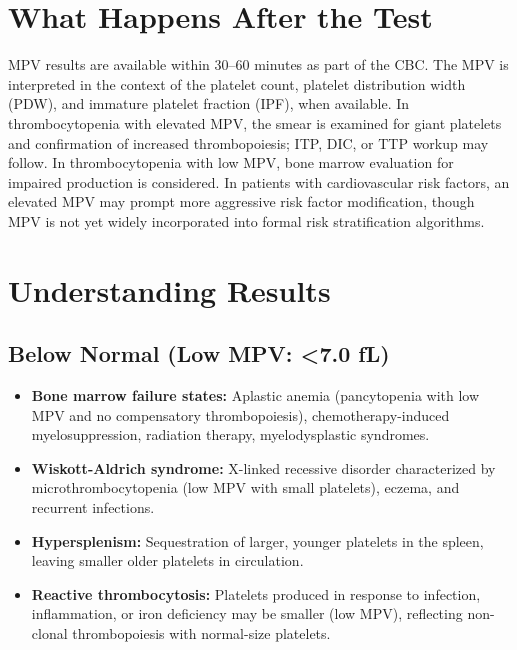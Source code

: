 \section*{What Happens After the Test}
MPV results are available within 30--60 minutes as part of the CBC. The MPV is interpreted in the context of the platelet count, platelet distribution width (PDW), and immature platelet fraction (IPF), when available. In thrombocytopenia with elevated MPV, the smear is examined for giant platelets and confirmation of increased thrombopoiesis; ITP, DIC, or TTP workup may follow. In thrombocytopenia with low MPV, bone marrow evaluation for impaired production is considered. In patients with cardiovascular risk factors, an elevated MPV may prompt more aggressive risk factor modification, though MPV is not yet widely incorporated into formal risk stratification algorithms.

\section*{Understanding Results}

\subsection*{Below Normal (Low MPV: <7.0 fL)}
\begin{itemize}
  \item \textbf{Bone marrow failure states:} Aplastic anemia (pancytopenia with low MPV and no compensatory thrombopoiesis), chemotherapy-induced myelosuppression, radiation therapy, myelodysplastic syndromes.
  \item \textbf{Wiskott-Aldrich syndrome:} X-linked recessive disorder characterized by microthrombocytopenia (low MPV with small platelets), eczema, and recurrent infections.
  \item \textbf{Hypersplenism:} Sequestration of larger, younger platelets in the spleen, leaving smaller older platelets in circulation.
  \item \textbf{Reactive thrombocytosis:} Platelets produced in response to infection, inflammation, or iron deficiency may be smaller (low MPV), reflecting non-clonal thrombopoiesis with normal-size platelets.
\end{itemize}

